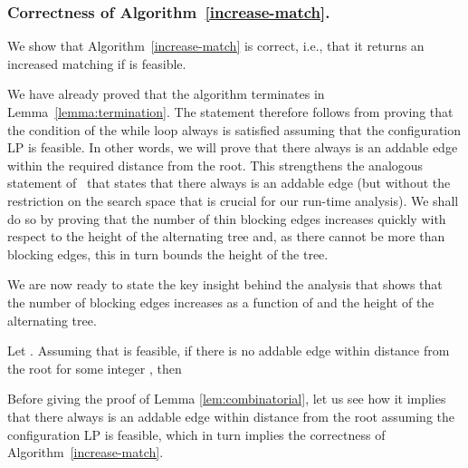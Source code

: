 \documentclass{llncs}
\begin{document}
\subsubsection{Correctness of Algorithm~\ref{increase-match}.}
\label{sec:correctness}
We show that Algorithm~\ref{increase-match} is correct, i.e., that it
returns an increased matching if  is feasible.

We have already proved that the algorithm terminates in
Lemma~\ref{lemma:termination}. The statement therefore follows from
proving that the condition of the while loop always is satisfied
assuming that the configuration LP is feasible. In other words, we
will prove that there always is an addable edge within the required
distance from the root. This strengthens the analogous statement
of~\cite{AFS08} that states that there always is an addable edge (but
without the restriction on the search space that is crucial for our run-time analysis).  We shall do so by proving
that the number of thin blocking edges increases quickly with respect
to the height of the alternating tree and, as there cannot be more
than  blocking edges, this in turn bounds the height of
the tree.

We are now ready to state the key insight behind the analysis that shows that
the number of blocking edges increases as a function of  and the height
of the alternating tree.
\begin{lemma}
Let . Assuming that  is feasible, if there is no
addable edge  within distance  from the root for some integer , then

\label{lem:combinatorial}
\end{lemma}

Before giving the proof of Lemma \ref{lem:combinatorial}, let us see how it
implies that there always is an addable edge within distance  from the root assuming the configuration LP
is feasible, which in turn implies the correctness of
Algorithm~\ref{increase-match}.
\end{document}
